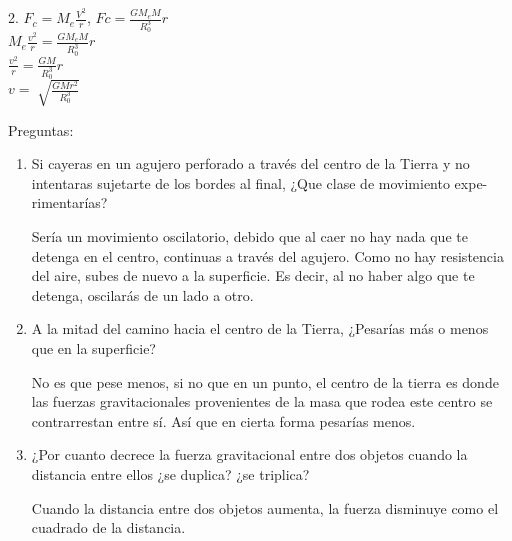 \documentclass[10pt, a4paper]{article}
\begin{document}
\begin{enumerate}
\begin{center}
            2. $F_c=M_e\frac{V^2}{r}$, $Fc=\frac{G M_e M}{R_0^3}r$\\
            $M_e\frac{v^2}{r}=\frac{G M_e M}{R_0^3}r$\\
            $\frac{v^2}{r}=\frac{G M}{R_0^3}r$\\
            $v=\sqrt[]{\frac{GMr^2}{R_0^3}}$

        \end{center}
    \end{enumerate}

    Preguntas:
    \begin{enumerate}
        \item Si cayeras en un agujero perforado a través del centro de la Tierra y no
        intentaras sujetarte de los bordes al final, ¿Que clase de movimiento expe-
        rimentarías?

        \begin{center}
            Sería un movimiento oscilatorio, debido que al caer no hay nada que te detenga en el centro,
            continuas a través del agujero. Como no hay resistencia del aire, subes de nuevo a la superficie.
            Es decir, al no haber algo que te detenga, oscilarás de un lado a otro.
        \end{center}

        \item A la mitad del camino hacia el centro de la Tierra, ¿Pesarías más o menos
        que en la superficie?

        \begin{center}
            No es que pese menos, si no que en un punto, el centro de la tierra es donde las fuerzas
            gravitacionales provenientes de la masa que rodea este centro se contrarrestan entre sí.
            Así que en cierta forma pesarías menos.
        \end{center}

        \item ¿Por cuanto decrece la fuerza gravitacional entre dos objetos cuando la
        distancia entre ellos ¿se duplica? ¿se triplica?

        \begin{center}
            Cuando la distancia entre dos objetos aumenta, la fuerza disminuye como el cuadrado de 
            la distancia.
        \end{center}

    \end{enumerate}
\end{document}
